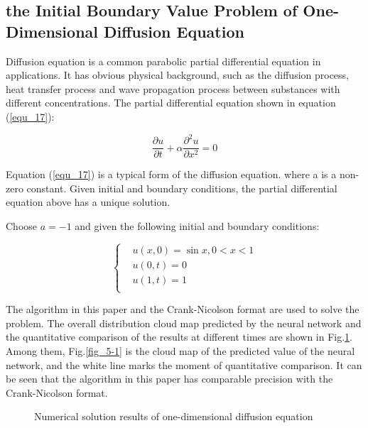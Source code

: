 \documentclass[10pt,journal,compsoc]{IEEEtran}
\begin{document}
\subsection{the Initial Boundary Value Problem of One-Dimensional Diffusion Equation}

Diffusion equation is a common parabolic partial differential equation in applications. It has obvious physical background, such as the diffusion process, heat transfer process and wave propagation process between substances with different concentrations. The partial differential equation shown in equation (\ref{equ_17}):

\begin{equation}
\dfrac{\partial u}{\partial t} + \alpha \dfrac{\partial^2{u}}{\partial{x^2}} = 0
\label{equ_17}
\end{equation}

Equation (\ref{equ_17}) is a typical form of the diffusion equation. where a is a non-zero constant. Given initial and boundary conditions, the partial differential equation above has a unique solution.

Choose $a=-1$ and given the following initial and boundary conditions:


\begin{equation}
\left\{
\begin{aligned}
&u(x,0) = \sin{x},0<x<1 \\
&u(0,t) = 0 \\
&u(1,t) = 1 \\
\end{aligned}
\right.
\label{equ_18}
\end{equation}

The algorithm in this paper and the Crank-Nicolson format are used to solve the problem. The overall distribution cloud map predicted by the neural network and the quantitative comparison of the results at different times are shown in Fig.\ref{fig_5}. Among them, Fig.\ref{fig_5-1} is the cloud map of the predicted value of the neural network, and the white line marks the moment of quantitative comparison. It can be seen that the algorithm in this paper has comparable precision with the Crank-Nicolson format.


\begin{figure}[!t]
\centering
{}
\vfil
{}
\caption{Numerical solution results of one-dimensional diffusion equation}
\label{fig_5}
\end{figure}
\end{document}

